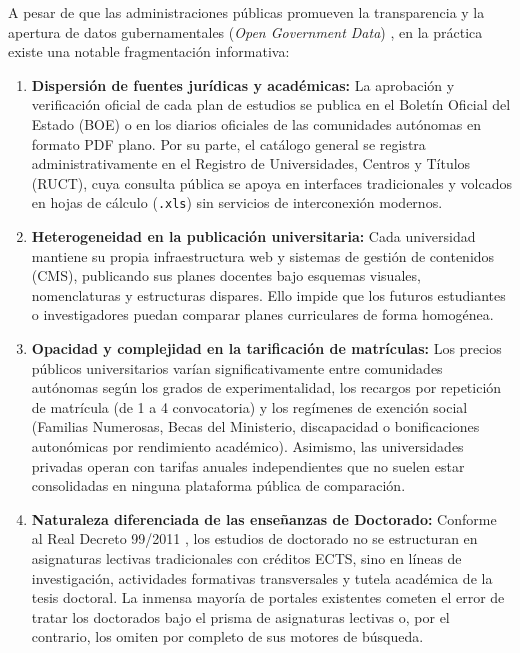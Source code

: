A pesar de que las administraciones públicas promueven la transparencia y la apertura de datos gubernamentales (\textit{Open Government Data}) \cite{attard2015systematic, janssen2012benefits}, en la práctica existe una notable fragmentación informativa:
\begin{enumerate}
    \item \textbf{Dispersión de fuentes jurídicas y académicas:} La aprobación y verificación oficial de cada plan de estudios se publica en el Boletín Oficial del Estado (BOE) o en los diarios oficiales de las comunidades autónomas en formato PDF plano. Por su parte, el catálogo general se registra administrativamente en el Registro de Universidades, Centros y Títulos (RUCT), cuya consulta pública se apoya en interfaces tradicionales y volcados en hojas de cálculo (\texttt{.xls}) sin servicios de interconexión modernos.
    \item \textbf{Heterogeneidad en la publicación universitaria:} Cada universidad mantiene su propia infraestructura web y sistemas de gestión de contenidos (CMS), publicando sus planes docentes bajo esquemas visuales, nomenclaturas y estructuras dispares. Ello impide que los futuros estudiantes o investigadores puedan comparar planes curriculares de forma homogénea.
    \item \textbf{Opacidad y complejidad en la tarificación de matrículas:} Los precios públicos universitarios varían significativamente entre comunidades autónomas según los grados de experimentalidad, los recargos por repetición de matrícula (de 1\textordfeminine{} a 4\textordfeminine{} convocatoria) y los regímenes de exención social (Familias Numerosas, Becas del Ministerio, discapacidad o bonificaciones autonómicas por rendimiento académico). Asimismo, las universidades privadas operan con tarifas anuales independientes que no suelen estar consolidadas en ninguna plataforma pública de comparación.
    \item \textbf{Naturaleza diferenciada de las enseñanzas de Doctorado:} Conforme al Real Decreto 99/2011 \cite{rd99_2011}, los estudios de doctorado no se estructuran en asignaturas lectivas tradicionales con créditos ECTS, sino en líneas de investigación, actividades formativas transversales y tutela académica de la tesis doctoral. La inmensa mayoría de portales existentes cometen el error de tratar los doctorados bajo el prisma de asignaturas lectivas o, por el contrario, los omiten por completo de sus motores de búsqueda.
\end{enumerate}

